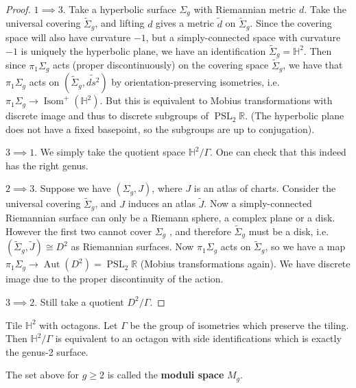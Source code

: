 \begin{proof}
  $1 \implies 3$. Take a hyperbolic surface $\Sigma_g$  with Riemannian metric $d$. Take the universal covering $\tilde{\Sigma}_g$, and lifting $d$ gives a metric $\tilde{d}$ on $\tilde{\Sigma}_g$. Since the covering space will also have curvature $-1$, but a simply-connected space with curvature $-1$ is uniquely the hyperbolic plane, we have an identification $\tilde{\Sigma}_g = \mathbb{H}^2$.  Then since $\pi_1 \Sigma_g$ acts (proper discontinuously) on the covering space $\tilde{\Sigma}_g$, we have that $\pi_1 \Sigma_g$ acts on $(\tilde{\Sigma} _g, \tilde{ds^2})$ by orientation-preserving isometries, i.e. $\pi_1 \Sigma_g \to \operatorname{Isom}^+ (\mathbb{H}^2)$. But this is equivalent to Mobius transformations with discrete image and thus to discrete subgroups of $\operatorname{PSL}_2 \mathbb{R}$.  (The hyperbolic plane does not have a fixed basepoint, so the subgroups are up to conjugation).

  $3 \implies 1$. We simply take the quotient space $\mathbb{H}^2 / \Gamma$. One can check that this indeed has the right genus.
  
  $2 \implies 3$. Suppose we have $(\Sigma_g, J)$, where $J$ is an atlas of charts. Consider the universal covering $\tilde{\Sigma}_g$, and $J$ induces an atlas $\tilde{J}$. Now a simply-connected Riemannian surface  can only be a Riemann sphere, a complex plane or a disk. However the first two cannot cover $\Sigma_g$ \TODO, and therefore $\tilde{\Sigma}_g$ must be a disk, i.e. $(\tilde{\Sigma}_g, \tilde{J}) \cong D^2$ as Riemannian surfaces. Now $\pi_1 \Sigma_g$ acts on $\tilde{\Sigma}_g$, so we have a map $\pi_1 \Sigma_g \to \operatorname{Aut}(D^2) = \operatorname{PSL}_2 \mathbb{R}$ (Mobius transformations again). We have discrete image due  to the proper discontinuity of the action.   

  $3 \implies 2$. Still take a quotient $D^2 / \Gamma$.  
\end{proof}

\begin{example}
    Tile $\mathbb{H}^2$ with octagons. Let $\Gamma$ be the group of isometries which preserve the tiling. Then $\mathbb{H}^2 / \Gamma$ is equivalent to an octagon with side identifications which is exactly the genus-2 surface.     
\end{example}


\begin{definition}
  The set above for $g \ge 2$ is called the \textbf{moduli space} $M_g$.   
\end{definition}


